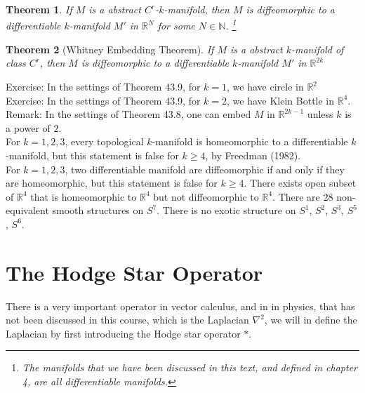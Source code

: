 \documentclass[11pt,oneside]{book}
\theoremstyle{break}
\theoremstyle{break}
\newtheorem{thm}{Theorem}[section]
\newcommand{\R}{\mathbb{R}}
\newcommand{\N}{\mathbb{N}}
\newcommand{\that}[1]{\widetilde{#1}}
\newcommand{\bmat}[1]{\begin{bmatrix} #1 \end{bmatrix}}
\newcommand{\remark}{\color{blue}Remark: \color{black}}
\newcommand{\exercise}{\color{green}Exercise: \color{black}}
\begin{document}
\begin{thm}
If $M$ is a abstract $C^r$-$k$-manifold, then $M$ is diffeomorphic to a differentiable $k$-manifold $M'$ in $\R^N$ for some $N \in \N$. \footnote{The manifolds that we have been discussed in this text, and defined in chapter 4, are all differentiable manifolds.}
\end{thm}

\begin{thm}[Whitney Embedding Theorem]
If $M$ is a abstract $k$-manifold of class $C^r$, then $M$ is diffeomorphic to a differentiable $k$-manifold $M'$ in $\R^{2k}$
\end{thm}

\exercise In the settings of Theorem 43.9, for $k=1$, we have circle in $\R^2$\\
\exercise In the settings of Theorem 43.9, for $k=2$, we have Klein Bottle in $\R^4$. \\

\remark In the settings of Theorem 43.8, one can embed $M$ in $\R^{2k-1}$ unless $k$ is a power of $2$.\\




For $k=1,2,3$, every topological $k$-manifold is homeomorphic to a differentiable $k$-manifold, but this statement is false for $k\geq 4$, by Freedman (1982).\\

For $k=1,2,3$, two differentiable manifold are diffeomorphic if and only if they are homeomorphic, but this statement is false for $k \geq 4$. There exists open subset of $\R^4$ that is homeomorphic to $\R^4$ but not diffeomorphic to $\R^4$. There are $28$ non-equivalent smooth structures on $S^7$. There is no exotic structure on $S^1$, $S^2$, $S^3$, $S^5$, $S^6$.


\newpage
\section[The Hodge Star Operator]{\color{red}The Hodge Star Operator\color{black}}
There is a very important operator in vector calculus, and in in physics, that has not been discussed in this course, which is the Laplacian $\nabla^2$, we will in define the Laplacian by first introducing the Hodge star operator $*$. 
\end{document}
